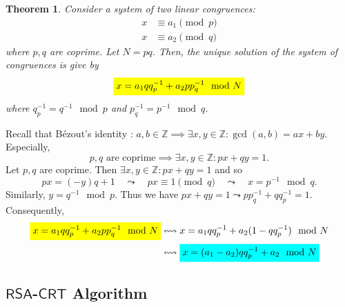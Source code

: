 \documentclass{article}
\newcommand{\mathcolorbox}[2]{\colorbox{#1}{$\displaystyle #2$}}
\newcommand{\rsa}{\mathsf{RSA}}
\newcommand{\inv}[1]{#1^{-1}}
\newtheorem*{theorem*}{Theorem}
\theoremstyle{definition}
\begin{document}
\begin{tcolorbox}[title=Chinese Remainder Theorem (CRT) - Special Case]
	\begin{theorem*}
		Consider a system of two linear congruences:
		\begin{align*}
			x&\equiv a_1 \pmod{p}\\
			x&\equiv a_2 \pmod{q}
		\end{align*} where $p,q$ are coprime. Let $N=pq$. Then, the unique solution of the system of congruences is give by \begin{align*}
			\mathcolorbox{-blue}{x=a_1qq_p^{-1}+a_2pp_q^{-1}\mod{N}}
		\end{align*} where $q_p^{-1}=\inv{q}\mod{p}$ and $p_{q}^{-1}=\inv{p}\mod{q}$.
	\end{theorem*}
	\tcblower
	Recall that Bézout's identity : $
	a,b\in\mathbb{Z}\implies\exists x,y\in\mathbb{Z}:\gcd(a,b)=ax+by.
	$ Especially, \[
	\text{$p,q$ are coprime}\implies\exists x,y\in\mathbb{Z}: px+qy=1.
	\] Let $p,q$ are coprime. Then $\exists x,y\in\mathbb{Z}:px+qy=1$ and so \[
	px=(-y)q+1\quad\leadsto\quad px\equiv1\pmod{q}\quad\leadsto\quad x=p^{-1}\mod{q}.
	\] Similarly, $y=q^{-1}\mod{p}$. Thus we have $px+qy=1\leadsto pp_{q}^{-1}+qq_{p}^{-1}=1$. Consequently, \begin{align*}
		\mathcolorbox{-blue}{x=a_1qq_p^{-1}+a_2pp_q^{-1}\mod{N}} &\leftrightsquigarrow x=a_1qq_p^{-1}+a_2(1-qq_{p}^{-1})\mod{N}\\
		&\leftrightsquigarrow \mathcolorbox{-red}{x=(a_1-a_2)qq_p^{-1}+a_2\mod{N}}\\
	\end{align*}
\end{tcolorbox}

\newpage
\subsection{$\rsa$-$\mathsf{CRT}$ Algorithm}
\end{document}
